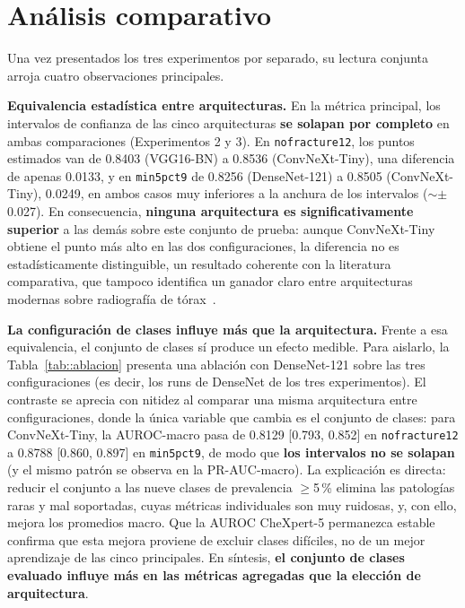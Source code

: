 \section{Análisis comparativo}
\label{sec::res_analisis}

Una vez presentados los tres experimentos por separado, su lectura conjunta arroja
cuatro observaciones principales.

\textbf{Equivalencia estadística entre arquitecturas.} En la métrica principal, los
intervalos de confianza de las cinco arquitecturas \textbf{se solapan por completo} en
ambas comparaciones (Experimentos 2 y 3). En \texttt{nofracture12}, los puntos estimados
van de 0.8403 (VGG16-BN) a 0.8536 (ConvNeXt-Tiny), una diferencia de apenas 0.0133, y en
\texttt{min5pct9} de 0.8256 (DenseNet-121) a 0.8505 (ConvNeXt-Tiny), 0.0249, en ambos
casos muy inferiores a la anchura de los intervalos ($\sim$$\pm$0.027). En consecuencia,
\textbf{ninguna arquitectura es significativamente superior} a las demás sobre este
conjunto de prueba: aunque ConvNeXt-Tiny obtiene el punto más alto en las dos
configuraciones, la diferencia no es estadísticamente distinguible, un resultado
coherente con la literatura comparativa, que tampoco identifica un ganador claro entre
arquitecturas modernas sobre radiografía de tórax~\cite{bressemComparingDeepLearning2020}.

\textbf{La configuración de clases influye más que la arquitectura.} Frente a esa
equivalencia, el conjunto de clases sí produce un efecto medible. Para aislarlo, la
Tabla~\ref{tab::ablacion} presenta una ablación con DenseNet-121 sobre las tres
configuraciones (es decir, los runs de DenseNet de los tres experimentos). El contraste
se aprecia con nitidez al comparar una misma arquitectura entre configuraciones, donde
la única variable que cambia es el conjunto de clases: para ConvNeXt-Tiny, la
AUROC-macro pasa de 0.8129 [0.793, 0.852] en \texttt{nofracture12} a 0.8788 [0.860,
0.897] en \texttt{min5pct9}, de modo que \textbf{los intervalos no se solapan} (y el
mismo patrón se observa en la PR-AUC-macro). La explicación es directa: reducir el
conjunto a las nueve clases de prevalencia $\geq$5\,\% elimina las patologías raras y
mal soportadas, cuyas métricas individuales son muy ruidosas, y, con ello, mejora los
promedios macro. Que la AUROC CheXpert-5 permanezca estable confirma que esta mejora
proviene de excluir clases difíciles, no de un mejor aprendizaje de las cinco
principales. En síntesis, \textbf{el conjunto de clases evaluado influye más en las
métricas agregadas que la elección de arquitectura}.

